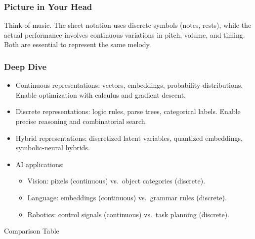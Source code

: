 \documentclass[
  letterpaper,
  DIV=11,
  numbers=noendperiod]{scrreprt}
\providecommand{\tightlist}{%
  \setlength{\itemsep}{0pt}\setlength{\parskip}{0pt}}
\begin{document}
\subsubsection{Picture in Your Head}\label{picture-in-your-head-45}

Think of music. The sheet notation uses discrete symbols (notes, rests),
while the actual performance involves continuous variations in pitch,
volume, and timing. Both are essential to represent the same melody.

\subsubsection{Deep Dive}\label{deep-dive-45}

\begin{itemize}
\item
  Continuous representations: vectors, embeddings, probability
  distributions. Enable optimization with calculus and gradient descent.
\item
  Discrete representations: logic rules, parse trees, categorical
  labels. Enable precise reasoning and combinatorial search.
\item
  Hybrid representations: discretized latent variables, quantized
  embeddings, symbolic-neural hybrids.
\item
  AI applications:

  \begin{itemize}
  \tightlist
  \item
    Vision: pixels (continuous) vs.~object categories (discrete).
  \item
    Language: embeddings (continuous) vs.~grammar rules (discrete).
  \item
    Robotics: control signals (continuous) vs.~task planning (discrete).
  \end{itemize}
\end{itemize}

Comparison Table
\end{document}
